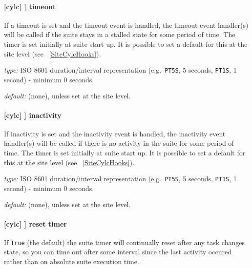 \paragraph[timeout]{[cylc] \textrightarrow [[events]] \textrightarrow timeout}

If a timeout is set and the timeout event is handled, the timeout event
handler(s) will be called if the suite stays in a stalled state for some period
of time. The timer is set initially at suite start up. It is possible to set a
default for this at the site level (see ~\ref{SiteCylcHooks}).

\begin{myitemize}
    \item {\em type:} ISO 8601 duration/interval representation (e.g.\ 
 \lstinline=PT5S=, 5 seconds, \lstinline=PT1S=, 1 second) - minimum 0 seconds.
    \item {\em default:} (none), unless set at the site level.
\end{myitemize}

\paragraph[inactivity]{[cylc] \textrightarrow [[events]] \textrightarrow inactivity}

If inactivity is set and the inactivity event is handled, the inactivity event
handler(s) will be called if there is no activity in the suite for some period
of time. The timer is set initially at suite start up. It is possible to set a
default for this at the site level (see ~\ref{SiteCylcHooks}).

\begin{myitemize}
    \item {\em type:} ISO 8601 duration/interval representation (e.g.\  
 \lstinline=PT5S=, 5 seconds, \lstinline=PT1S=, 1 second) - minimum 0 seconds.
    \item {\em default:} (none), unless set at the site level.
\end{myitemize}

\paragraph[reset timer]{[cylc] \textrightarrow [[events]] \textrightarrow reset timer}

If \lstinline=True= (the default) the suite timer will continually reset
after any task changes state, so you can time out after some interval
since the last activity occured rather than on absolute suite execution
time.

